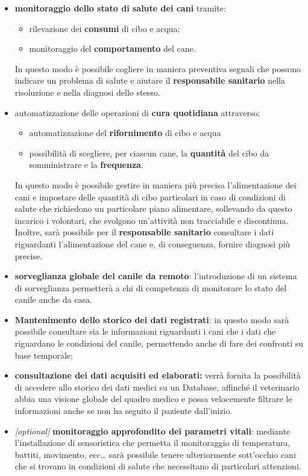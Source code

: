 \begin{itemize}
    \item \textbf{monitoraggio dello stato di salute dei cani} tramite:
    \begin{itemize}
        \item rilevazione dei \textbf{consumi} di cibo e acqua;
        \item monitoraggio del \textbf{comportamento} del cane.
    \end{itemize}
    In questo modo è possibile cogliere in maniera preventiva segnali che possono indicare un problema di salute e aiutare il \textbf{responsabile sanitario} nella risoluzione e nella diagnosi dello stesso. 
    \item automatizzazione delle operazioni di
\textbf{cura quotidiana} attraverso:
    \begin{itemize}
        \item automatizzazione del \textbf{rifornimento} di cibo e acqua
        \item possibilità di scegliere, per ciascun cane, la \textbf{quantità} del cibo da somministrare e la \textbf{frequenza}.
    \end{itemize}
    In questo modo è possibile gestire in maniera più precisa l'alimentazione dei cani e impostare delle quantità di cibo particolari in caso di condizioni di salute che richiedono un particolare piano alimentare, sollevando da questo incarico i volontari, che svolgono un'attività non tracciabile e discontinua. Inoltre, sarà possibile per il \textbf{responsabile sanitario} consultare i dati riguardanti l'alimentazione del cane e, di conseguenza, fornire diagnosi più precise. 
    \item \textbf{sorveglianza
globale del canile da remoto}: l'introduzione di un sistema di sorveglianza permetterà a chi di competenza di monitorare lo stato del canile anche da casa.
\item \textbf{Mantenimento dello storico dei dati registrati}: in questo modo sarà possibile consultare sia le informazioni riguardanti i cani che i dati che riguardano le condizioni del canile, permettendo anche di fare dei confronti su base temporale;
\item \textbf{consultazione dei dati acquisiti ed elaborati:} verrà fornita la possibilità di accedere allo storico dei dati medici su un Database, affinché il veterinario abbia una visione globale del quadro medico e possa velocemente filtrare le informazioni anche se non ha seguito il paziente dall'inizio. 
\item \emph{{[}optional{]}} 
\textbf{monitoraggio approfondito dei parametri vitali}: mediante l'installazione di sensoristica che permetta il monitoraggio di temperatura, battiti, movimento, ecc\ldots{} sarà possibile tenere ulteriormente sott'occhio cani che si trovano in condizioni di salute che necessitano di particolari attenzioni.


\end{itemize}
